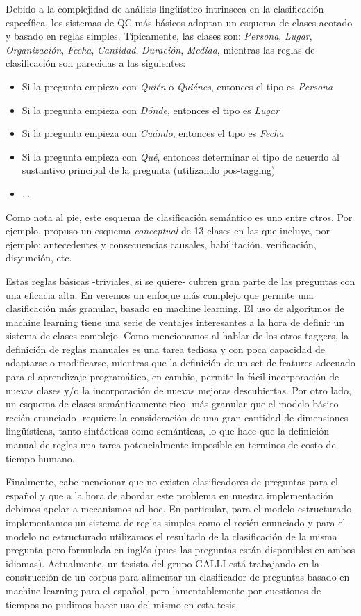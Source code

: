 Debido a la complejidad de análisis lingüístico intrinseca en la clasificación específica, los sistemas de QC más básicos adoptan un esquema de clases acotado y basado en reglas simples. Típicamente, las clases son: \textit{Persona}, \textit{Lugar}, \textit{Organización}, \textit{Fecha}, \textit{Cantidad}, \textit{Duración}, \textit{Medida}, mientras las reglas de clasificación son parecidas a las siguientes:
\begin{itemize}
\item Si la pregunta empieza con \textit{Quién} o \textit{Quiénes}, entonces el tipo es \textit{Persona}
\item Si la pregunta empieza con \textit{Dónde}, entonces el tipo es \textit{Lugar}
\item Si la pregunta empieza con \textit{Cuándo}, entonces el tipo es \textit{Fecha}
\item Si la pregunta empieza con \textit{Qué}, entonces determinar el tipo de acuerdo al sustantivo principal de la pregunta (utilizando pos-tagging)
\item ...
\end{itemize}

Como nota al pie, este esquema de clasificación semántico es uno entre otros. Por ejemplo, \cite{QC-other} propuso un esquema \textit{conceptual} de 13 clases en las que incluye, por ejemplo: antecedentes y consecuencias causales, habilitación, verificación, disyunción, etc.

Estas reglas básicas -triviales, si se quiere- cubren gran parte de las preguntas con una eficacia alta. En  veremos un enfoque más complejo que permite una clasificación más granular, basado en machine learning. El uso de algoritmos de machine learning tiene una serie de ventajes interesantes a la hora de definir un sistema de clases complejo. Como mencionamos al hablar de los otros taggers, la definición de reglas manuales es una tarea tediosa y con poca capacidad de adaptarse o modificarse, mientras que la definición de un set de features adecuado para el aprendizaje programático, en cambio, permite la fácil incorporación de nuevas clases y/o la incorporación de nuevas mejoras descubiertas. Por otro lado, un esquema de clases semánticamente rico -más granular que el modelo básico recién enunciado- requiere la consideración de una gran cantidad de dimensiones lingüísticas, tanto sintácticas como semánticas, lo que hace que la definición manual de reglas una tarea potencialmente imposible en terminos de costo de tiempo humano. 

Finalmente, cabe mencionar que no existen clasificadores de preguntas para el español y que a la hora de abordar este problema en nuestra implementación debimos apelar a mecanismos ad-hoc. En particular, para el modelo estructurado implementamos un sistema de reglas simples como el recién enunciado y para el modelo no estructurado utilizamos el resultado de la clasificación de la misma pregunta pero formulada en inglés (pues las preguntas están disponibles en ambos idiomas).
Actualmente, un tesista del grupo GALLI está trabajando en la construcción de un corpus para alimentar un clasificador de preguntas basado en machine learning para el español, pero lamentablemente por cuestiones de tiempos no pudimos hacer uso del mismo en esta tesis.
